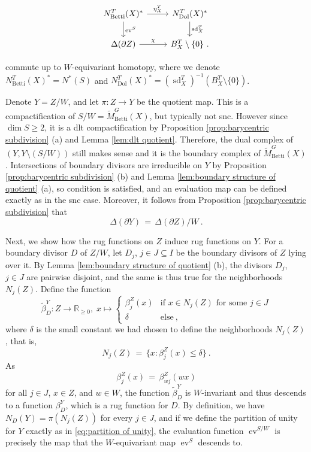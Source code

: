 \documentclass[11pt, a4paper]{amsart}
\theoremstyle{definition}
\theoremstyle{myitemstyle}
\newcommand{\R}{\mathbb{R}}
\DeclareMathOperator{\ev}{ev}
\newcommand{\Dol}{{\mathrm{Dol}}}
\newcommand{\Betti}{{\mathrm{Betti}}}
\newcommand{\sd}{{\operatorname{sd}}}
\newcommand{\equ}{\ensuremath{\,=\,}}
\begin{document}
\begin{equation}
\label{eq:T-case of geometric P=W}
\begin{tikzcd}
    N^T_\Betti(X)^*
    \arrow[d, "\ev^S"]
    \arrow[r, "\eta^T_X"] &
        N^T_\Dol(X)^*
        \arrow[d,"\sd^T_X"]\\
    \Delta(\partial Z)
    \arrow[r,"\chi"]&
        B^T_X\setminus \{0\}\ .
\end{tikzcd}    
\end{equation}

commute up to $W$-equivariant homotopy, where we denote $N^T_\Betti(X)^*= N^*(S)$ and $N^T_\Dol(X)^*=(\sd_X^T)^{-1} (B^T_X \setminus\{0\})$.

Denote $Y=Z/W$, and let $\pi\colon Z\to Y$ be the quotient map. This is a compactification of $S/W=\widetilde M^G_\Betti(X)$, but typically not snc. However since $\dim S\geq 2$, it is a dlt compactification by Proposition \ref{prop:barycentric subdivision} (a) and Lemma \ref{lem:dlt quotient}. Therefore, the dual complex of $(Y,Y\setminus (S/W))$ still makes sense and it is the boundary complex of $\widetilde M^G_\Betti(X)$. Intersections of boundary divisors are irreducible on $Y$ by Proposition \ref{prop:barycentric subdivision} (b) and Lemma \ref{lem:boundary structure of quotient} (a), so condition  is satisfied, and an evaluation map can be defined exactly as in the snc case. Moreover, it follows from Proposition \ref{prop:barycentric subdivision} that 
\[
\Delta(\partial Y) \equ \Delta(\partial Z)/W\ .
\]
 
Next, we show  how the rug functions on $Z$ induce rug functions on $Y$. For a boundary divisor $D$ of $Z/W$, let $D_j$, $j\in J\subseteq I$ be the boundary divisors of $Z$ lying over it. By Lemma \ref{lem:boundary structure of quotient} (b), the divisors $D_j$, $j\in J$ are pairwise disjoint, and the same is thus true for the neighborhoods $N_j(Z)$. Define the function
\[
\widetilde \beta^Y_D \colon Z\to \R_{\geq 0},\; x\mapsto 
\begin{cases}
    \beta_j^{Z}(x) &\text{if }x\in N_j(Z) \text{ for some }j\in J\\
    \delta &\text{else}\ ,
\end{cases}
\]
where $\delta$ is the small constant we had chosen to define the neighborhoods $N_j(Z)$, that is, 
\[
N_j(Z) \equ \{x:\beta^Z_j(x)\leq \delta\}\ .
\]
As 
\[
\beta^{Z}_j(x) \equ \beta^{Z}_{wj}(wx)
\]
for all $j\in J$, $x\in Z$, and $w\in W$, the function $\widetilde\beta^Y_D$ is $W$-invariant and thus descends to a function $\beta^Y_D$, which is a rug function for $D$. By definition, we have $N_D(Y)=\pi(N_j(Z))$ for every $j\in J$, and if we define the partition of unity for $Y$ exactly as in \eqref{eq:partition of unity}, the evaluation function $\ev^{S/W}$ is precisely the map that the $W$-equivariant map $\ev^{S}$ descends to.
\end{document}
